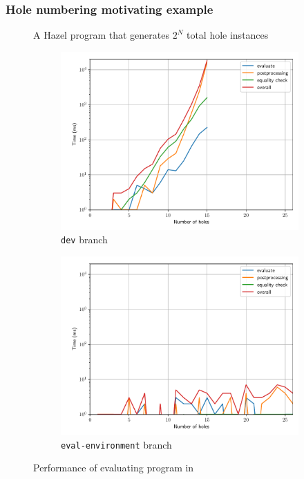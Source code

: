 \documentclass{beamer}
\begin{document}
\begin{frame}[allowframebreaks]
  \frametitle{Hole numbering motivating example}

  \begin{figure}
    \centering
    \caption{A Hazel program that generates $2^N$ total hole instances}
    \label{fig:hole-renumbering-problem-2}
  \end{figure}

  \begin{figure}
    \centering
    \begin{subfigure}{0.45\textwidth}
      \centering
      \includegraphics[width=\textwidth]{thesis/img/perf_renum_dev.pdf}
      \caption{\texttt{dev} branch}
      \label{fig:perf-renum-dev}
    \end{subfigure}
    \qquad
    \begin{subfigure}{0.45\textwidth}
      \centering
      \includegraphics[width=\textwidth]{thesis/img/perf_renum_eev.pdf}
      \caption{\texttt{eval-environment} branch}
      \label{fig:perf-renum-eev}
    \end{subfigure}
    \caption{Performance of evaluating program in }
    \label{fig:perf-renum}
  \end{figure}
\end{frame}
\end{document}
